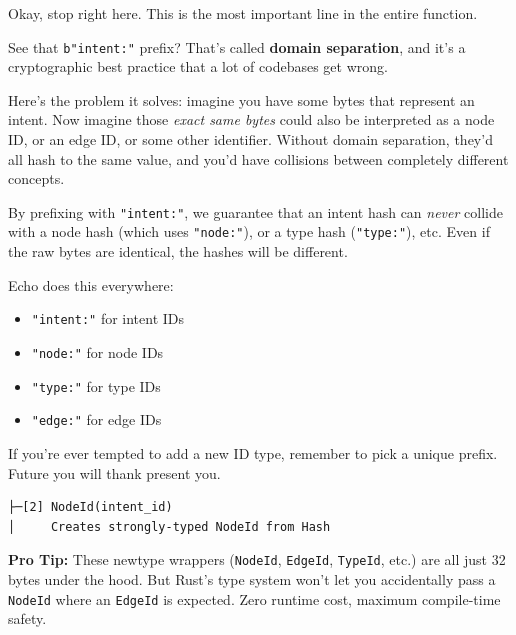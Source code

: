 \documentclass[11pt]{book}
\newenvironment{directors}
{\begin{mdframed}[
  linecolor=blue!60,
  linewidth=2pt,
  leftline=true,
  rightline=false,
  topline=false,
  bottomline=false,
  backgroundcolor=blue!3,
  innerleftmargin=12pt,
  innerrightmargin=10pt,
  innertopmargin=8pt,
  innerbottommargin=8pt,
  skipabove=12pt,
  skipbelow=12pt
]\small\sffamily\color{blue!70!black}}
{\end{mdframed}}
\newenvironment{protip}
{\begin{mdframed}[
  linecolor=green!60!black,
  linewidth=2pt,
  leftline=true,
  rightline=false,
  topline=false,
  bottomline=false,
  backgroundcolor=green!5,
  innerleftmargin=12pt,
  innerrightmargin=10pt,
  innertopmargin=8pt,
  innerbottommargin=8pt,
  skipabove=12pt,
  skipbelow=12pt
]\small\sffamily\color{green!50!black}\textbf{Pro Tip:} }
{\end{mdframed}}
\begin{document}
\begin{directors}
Okay, stop right here. This is the most important line in the entire function.

See that \texttt{b"intent:"} prefix? That's called \textbf{domain separation}, and it's a cryptographic best practice that a lot of codebases get wrong.

Here's the problem it solves: imagine you have some bytes that represent an intent. Now imagine those \emph{exact same bytes} could also be interpreted as a node ID, or an edge ID, or some other identifier. Without domain separation, they'd all hash to the same value, and you'd have collisions between completely different concepts.

By prefixing with \texttt{"intent:"}, we guarantee that an intent hash can \emph{never} collide with a node hash (which uses \texttt{"node:"}), or a type hash (\texttt{"type:"}), etc. Even if the raw bytes are identical, the hashes will be different.

Echo does this everywhere:
\begin{itemize}
\item \texttt{"intent:"} for intent IDs
\item \texttt{"node:"} for node IDs
\item \texttt{"type:"} for type IDs
\item \texttt{"edge:"} for edge IDs
\end{itemize}

If you're ever tempted to add a new ID type, remember to pick a unique prefix. Future you will thank present you.
\end{directors}

\begin{verbatim}
├─[2] NodeId(intent_id)
│     Creates strongly-typed NodeId from Hash
\end{verbatim}

\begin{protip}
These newtype wrappers (\texttt{NodeId}, \texttt{EdgeId}, \texttt{TypeId}, etc.) are all just 32 bytes under the hood. But Rust's type system won't let you accidentally pass a \texttt{NodeId} where an \texttt{EdgeId} is expected. Zero runtime cost, maximum compile-time safety.
\end{protip}
\end{document}
